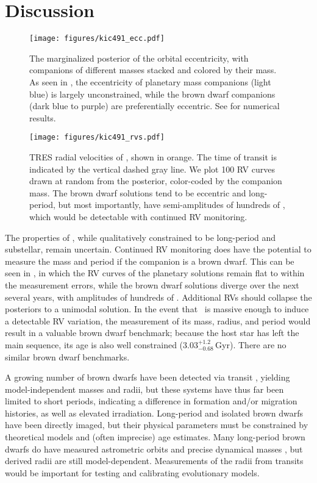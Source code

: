 \documentclass[twocolumn]{aastex63}
\begin{document}


\section{Discussion}
\label{sec:discussion}

\begin{figure}[!t]
    \centering
    \texttt{[image: figures/kic491\_ecc.pdf]}
    \caption{The marginalized posterior of the orbital eccentricity, with companions of different masses stacked and colored by their mass. As seen in , the eccentricity of planetary mass companions (light blue) is largely unconstrained, while the brown dwarf companions (dark blue to purple) are preferentially eccentric. See  for numerical results.}
    \label{fig:ehist}
\end{figure}

\begin{figure}[!t]
    \centering
    \texttt{[image: figures/kic491\_rvs.pdf]}
    \caption{TRES radial velocities of \thisstar, shown in orange. The time of transit is indicated by the vertical dashed gray line. We plot 100 RV curves drawn at random from the posterior, color-coded by the companion mass. The brown dwarf solutions tend to be eccentric and long-period, but most importantly, have semi-amplitudes of hundreds of \ms, which would be detectable with continued RV monitoring.}
    \label{fig:rv}
\end{figure}

The properties of \thisstarb, while qualitatively constrained to be long-period and substellar, remain uncertain. Continued RV monitoring does have the potential to measure the mass and period if the companion is a brown dwarf. This can be seen in , in which the RV curves of the planetary solutions remain flat to within the measurement errors, while the brown dwarf solutions diverge over the next several years, with amplitudes of hundreds of \ms. Additional RVs should collapse the posteriors to a unimodal solution. In the event that \thisstarb\ is massive enough to induce a detectable RV variation, the measurement of its mass, radius, and period would result in a valuable brown dwarf benchmark; because the host star has left the main sequence, its age is also well constrained ($3.03^{+1.2}_{-0.68}$\,Gyr). There are no similar brown dwarf benchmarks. 

A growing number of brown dwarfs have been detected via transit \citep[see, e.g.][]{carmichael:2020,carmichael:2021}, yielding model-independent masses and radii, but these systems have thus far been limited to short periods, indicating a difference in formation and/or migration histories, as well as elevated irradiation. Long-period and isolated brown dwarfs have been directly imaged, but their physical parameters must be constrained by theoretical models and (often imprecise) age estimates. Many long-period brown dwarfs do have measured astrometric orbits and precise dynamical masses \citep[see, e.g.,][]{dupuy:2017}, but derived radii are still model-dependent. Measurements of the radii from transits would be important for testing and calibrating evolutionary models.
\end{document}

